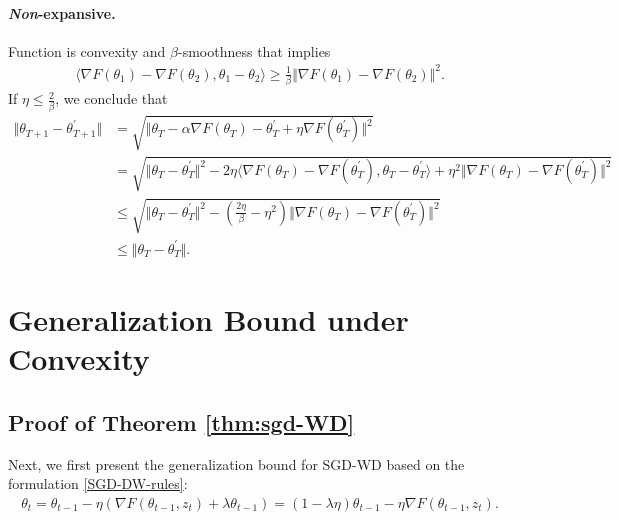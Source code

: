 \paragraph{\emph{Non}-expansive.} Function is convexity and $\beta$-smoothness that implies 
\begin{equation}\label{eq:app2.2}
     \begin{aligned}
      \langle \nabla F(\theta_1) -\nabla F(\theta_2), \theta_1 - \theta_2 \rangle \geq \frac{1}{\beta} \Vert \nabla F(\theta_1) -\nabla F(\theta_2)\Vert^2 .
     \end{aligned}
\end{equation}
If $\eta \leq \frac{2}{\beta}$, we conclude that
\begin{equation}\label{eq:app2.3}
     \begin{aligned}
      \Vert \theta_{T+1} - \theta_{T+1}^{\prime}\Vert &= \sqrt{\Vert \theta_{T} - \alpha \nabla F(\theta_{T}) - \theta_{T}^{\prime} + \eta \nabla F(\theta_{T}^{\prime})\Vert^2}  \\
      &=\sqrt{\Vert \theta_{T} - \theta_{T}^{\prime} \Vert^2 - 2\eta\langle \nabla F(\theta_{T}) -\nabla F(\theta_{T}^{\prime}), \theta_T- \theta_T^{\prime} \rangle +\eta^2 \Vert \nabla F(\theta_{T}) - \nabla F(\theta_{T}^{\prime})\Vert^2} \\
      &\leq \sqrt{\Vert \theta_T- \theta_T^{\prime}\Vert^2 - \left(\frac{2\eta}{\beta} -\eta^2 \right) \Vert \nabla F(\theta_{T}) -\nabla F(\theta_{T}^{\prime})\Vert^2} \\
      &\leq \Vert \theta_T- \theta_T^{\prime}\Vert.
     \end{aligned}
\end{equation}


\section{Generalization Bound under Convexity}\label{sec:app-convex}

\subsection{Proof of Theorem \ref{thm:sgd-WD}}\label{sec:app-thm4.1}
Next, we first present the generalization bound for SGD-WD based on the formulation \eqref{SGD-DW-rules}:
\begin{equation}
  \begin{aligned}
   \theta_t =  \theta_{t-1} - \eta (\nabla F(\theta_{t-1},z_{t}) + \lambda \theta_{t-1} ) = (1-\lambda \eta) \theta_{t-1} - \eta \nabla F(\theta_{t-1},z_{t}).
  \end{aligned}
 \end{equation}

